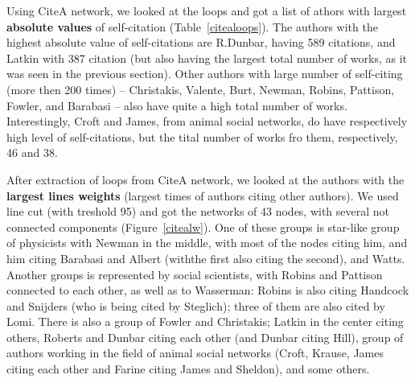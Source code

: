 \documentclass[11pt]{article} %
\begin{document}
Using CiteA network, we looked at the loops and got a list of athors with largest \textbf{absolute values} of self-citation (Table~\ref{citealoops}). The authors with the highest absolute value of self-citations are R.Dunbar, having 589 citations, and Latkin with 387 citation (but also having the largest total number of works, as it was seen in the previous section). Other authors with large number of self-citing (more then 200 times) -- Christakis, Valente, Burt, Newman, Robins, Pattison, Fowler, and Barabasi -- also have quite a high total number of works. Interestingly, Croft and James, from animal social networks, do have respectively high level of self-citations, but the tital number of works fro them, respectively, 46 and 38. \medskip   

After extraction of loops from CiteA network, we looked at the authors with the \textbf{largest lines weights} (largest times of authors citing other authors). We used line cut (with treshold 95) and got the networks of 43 nodes, with several not connected components (Figure~\ref{citealw}). One of these groups is star-like group of physicists with Newman in the middle, with most of the nodes citing him, and him citing Barabasi and Albert (withthe first also citing the second), and Watts. Another groups is represented by social scientists, with Robins and Pattison connected to each other, as well as to Wasserman: Robins is also citing Handcock and Snijders (who is being cited by Steglich); three of them are also cited by Lomi. There is also a group of Fowler and Christakis; Latkin in the center citing others, Roberts and Dunbar citing each other (and Dunbar citing Hill), group of authors working in the field of animal social networks (Croft, Krause, James citing each other and Farine citing James and Sheldon), and some others. \medskip 

\medskip 
\end{document}
